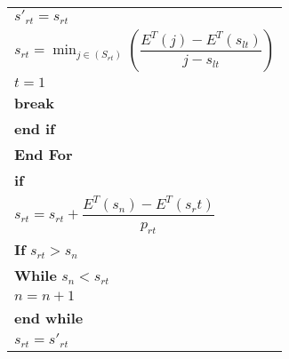 \begin{table}
\begin{minipage}[b]{8cm}
\begin{tabular}{p{7cm}}
\\
\hspace{10mm}$s'_{rt} = s_{rt}$
\\
\hspace{10mm}$s_{rt} = \displaystyle \min_{j\in(S_{rt})}(\dfrac{E^T(j)-E^T(s_{lt})}{j-s_{lt}})$
\\
\hspace{10mm}$t=1$
\\
\hspace{10mm}\textbf{break}
\\
\hspace{7mm}\textbf{end if}
\\
\hspace{4mm}\textbf{End For}
\\
\hspace{4mm}\textbf{if}
\\
\hspace{7mm} $s_{rt} = s_{rt} + \dfrac{E^T(s_n)-E^T(s_rt)}{p_{rt}}$
\\
\hspace{7mm}\textbf{If} $s_{rt}>s_{n}$
\\
\hspace{10mm}\textbf{While} $s_n < s_{rt}$
\\
\hspace{13mm} $n=n+1$
\\
\hspace{10mm} \textbf{end while}
\\
\hspace{7mm} $s_{rt} = s'_{rt}$
\\

\end{tabular}
\end{minipage}
\end{table}
